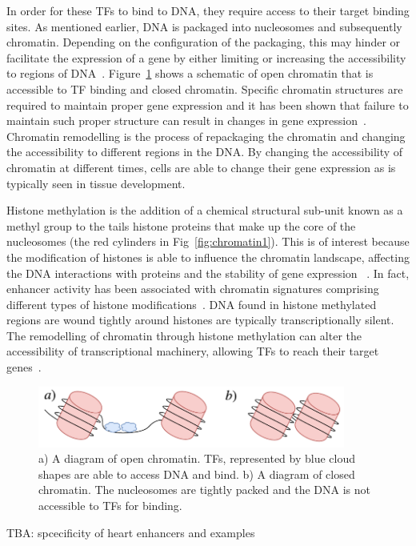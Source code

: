         In order for these TFs to bind to DNA, they require access to their target binding sites. As mentioned earlier, DNA is packaged into nucleosomes and subsequently chromatin. Depending on the configuration of the packaging, this may hinder or facilitate the expression of a gene by either limiting or increasing the accessibility to regions of DNA~\cite{li2007role}. Figure~\ref{fig:openclose} shows a schematic of open chromatin that is accessible to TF binding and closed chromatin. Specific chromatin structures are required to maintain proper gene expression and it has been shown that failure to maintain such proper structure can result in changes in gene expression~\cite{ehrlich2001dna}. Chromatin remodelling is the process of repackaging the chromatin and changing the accessibility to different regions in the DNA. By changing the accessibility of chromatin at different times, cells are able to change their gene expression as is typically seen in tissue development.%

        Histone methylation is the addition of a chemical structural sub-unit known as a methyl group to the tails histone proteins that make up the core of the nucleosomes (the red cylinders in Fig~\ref{fig:chromatin1}). This is of interest because the modification of histones is able to influence the chromatin landscape, affecting the DNA interactions with proteins and the stability of gene expression ~\cite{jaenisch2003epigenetic, whetstine2009histone}.
        In fact, enhancer activity has been associated with chromatin signatures comprising different types of histone modifications~\cite{heintzman2007distinct, creyghton2010histone, rada2011unique}.
        DNA found in histone methylated regions are wound tightly around histones are typically transcriptionally silent.
        The remodelling of chromatin through histone methylation can alter the accessibility of transcriptional machinery, allowing TFs to reach their target genes~\cite{gibney2010epigenetics, holoch2015rna}. 

        \begin{figure}[H]
            \centering
            \includegraphics[width=0.9\textwidth]{OpenCloseChromatin.pdf}
            \caption{a) A diagram of open chromatin. TFs, represented by blue cloud shapes are able to access DNA and bind. b) A diagram of closed chromatin. The nucleosomes are tightly packed and the DNA is not accessible to TFs for binding.}
            \label{fig:openclose}
        \end{figure}
        TBA: spcecificity of heart enhancers and examples

